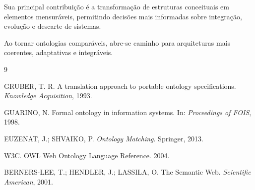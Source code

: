 \documentclass[12pt,a4paper]{article}
\begin{document}
	Sua principal contribuição é a transformação de estruturas conceituais em elementos mensuráveis, permitindo decisões mais informadas sobre integração, evolução e descarte de sistemas.

	Ao tornar ontologias comparáveis, abre-se caminho para arquiteturas mais coerentes, adaptativas e integráveis.

\begin{thebibliography}{9}

	GRUBER, T. R. A translation approach to portable ontology specifications.
	\textit{Knowledge Acquisition}, 1993.

	GUARINO, N. Formal ontology in information systems.
	In: \textit{Proceedings of FOIS}, 1998.

	EUZENAT, J.; SHVAIKO, P.
	\textit{Ontology Matching}.
	Springer, 2013.

	W3C. OWL Web Ontology Language Reference.
	2004.

	BERNERS-LEE, T.; HENDLER, J.; LASSILA, O.
	The Semantic Web.
	\textit{Scientific American}, 2001.

\end{thebibliography}
\end{document}
